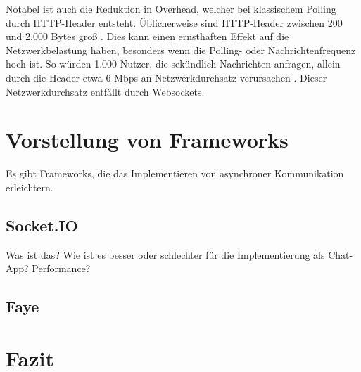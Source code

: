 \documentclass[sigplan, screen]{acmart}
\begin{document}
Notabel ist auch die Reduktion in Overhead, welcher bei klassischem Polling durch HTTP-Header entsteht. 
Üblicherweise sind HTTP-Header zwischen 200 und 2.000 Bytes groß \cite{noauthor_spdy_nodate}.
Dies kann einen ernsthaften Effekt auf die Netzwerkbelastung haben, besonders wenn die Polling- oder Nachrichtenfrequenz hoch ist.
So würden 1.000 Nutzer, die sekündlich Nachrichten anfragen, allein durch die Header etwa 6 Mbps an Netzwerkdurchsatz verursachen \cite{lubbers_html5_nodate}.
Dieser Netzwerkdurchsatz entfällt durch Websockets.

\section{Vorstellung von Frameworks}

Es gibt Frameworks, die das Implementieren von asynchroner Kommunikation erleichtern.

\subsection{Socket.IO}

Was ist das? Wie ist es besser oder schlechter für die Implementierung als Chat-App? Performance?

\subsection{Faye}

\section{Fazit}

\end{document}

